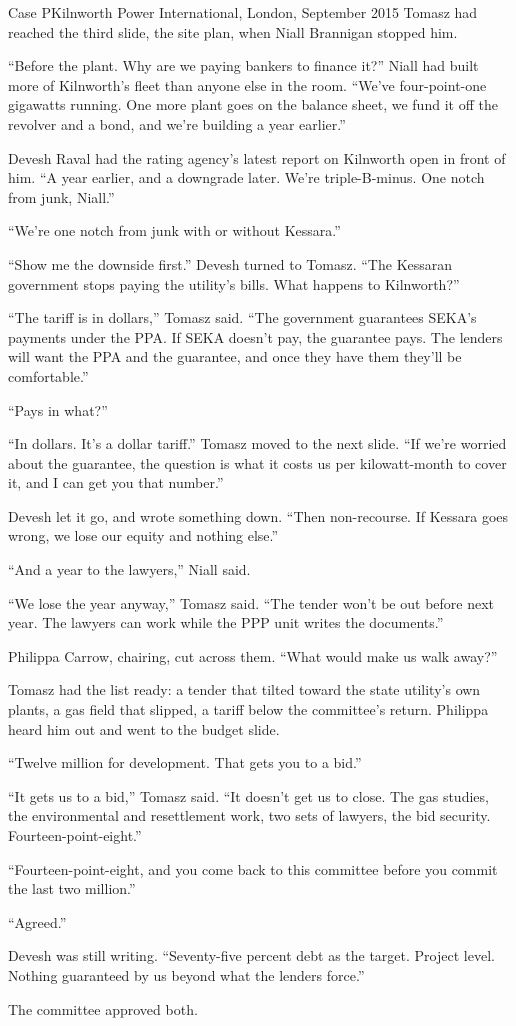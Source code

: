 \begin{casescene}{Case P}{Kilnworth Power International, London, September 2015}
Tomasz had reached the third slide, the site plan, when Niall Brannigan stopped him.

``Before the plant. Why are we paying bankers to finance it?'' Niall had built more of Kilnworth's fleet than anyone else in the room. ``We've four-point-one gigawatts running. One more plant goes on the balance sheet, we fund it off the revolver and a bond, and we're building a year earlier.''

Devesh Raval had the rating agency's latest report on Kilnworth open in front of him. ``A year earlier, and a downgrade later. We're triple-B-minus. One notch from junk, Niall.''

``We're one notch from junk with or without Kessara.''

``Show me the downside first.'' Devesh turned to Tomasz. ``The Kessaran government stops paying the utility's bills. What happens to Kilnworth?''

``The tariff is in dollars,'' Tomasz said. ``The government guarantees SEKA's payments under the PPA. If SEKA doesn't pay, the guarantee pays. The lenders will want the PPA and the guarantee, and once they have them they'll be comfortable.''

``Pays in what?''

``In dollars. It's a dollar tariff.'' Tomasz moved to the next slide. ``If we're worried about the guarantee, the question is what it costs us per kilowatt-month to cover it, and I can get you that number.''

Devesh let it go, and wrote something down. ``Then non-recourse. If Kessara goes wrong, we lose our equity and nothing else.''

``And a year to the lawyers,'' Niall said.

``We lose the year anyway,'' Tomasz said. ``The tender won't be out before next year. The lawyers can work while the PPP unit writes the documents.''

Philippa Carrow, chairing, cut across them. ``What would make us walk away?''

Tomasz had the list ready: a tender that tilted toward the state utility's own plants, a gas field that slipped, a tariff below the committee's return. Philippa heard him out and went to the budget slide.

``Twelve million for development. That gets you to a bid.''

``It gets us to a bid,'' Tomasz said. ``It doesn't get us to close. The gas studies, the environmental and resettlement work, two sets of lawyers, the bid security. Fourteen-point-eight.''

``Fourteen-point-eight, and you come back to this committee before you commit the last two million.''

``Agreed.''

Devesh was still writing. ``Seventy-five percent debt as the target. Project level. Nothing guaranteed by us beyond what the lenders force.''

The committee approved both.
\end{casescene}

